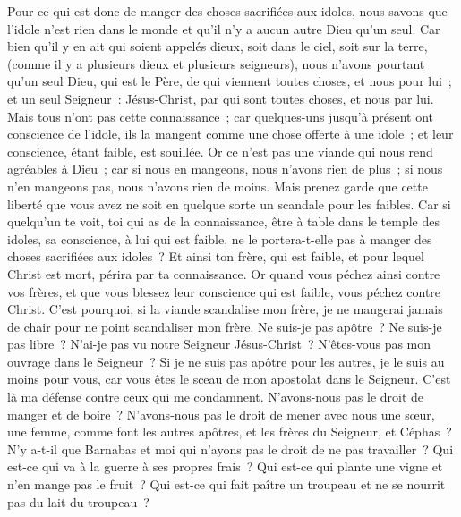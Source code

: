 \begin{multicols}{2}
Pour ce qui est donc de manger des choses sacrifiées aux idoles, nous savons que l'idole n'est rien dans le monde et qu'il n'y a aucun autre Dieu qu'un seul.
Car bien qu'il y en ait qui soient appelés dieux, soit dans le ciel, soit sur la terre, (comme il y a plusieurs dieux et plusieurs seigneurs),
nous n'avons pourtant qu'un seul Dieu, qui est le Père, de qui viennent toutes choses, et nous pour lui~; et un seul Seigneur~: Jésus-Christ, par qui sont toutes choses, et nous par lui.
Mais tous n'ont pas cette connaissance~; car quelques-uns jusqu'à présent ont conscience de l'idole, ils la mangent comme une chose offerte à une idole~; et leur conscience, étant faible, est souillée.
Or ce n'est pas une viande qui nous rend agréables à Dieu~; car si nous en mangeons, nous n'avons rien de plus~; si nous n'en mangeons pas, nous n'avons rien de moins.
Mais prenez garde que cette liberté que vous avez ne soit en quelque sorte un scandale pour les faibles.
Car si quelqu'un te voit, toi qui as de la connaissance, être à table dans le temple des idoles, sa conscience, à lui qui est faible, ne le portera-t-elle pas à manger des choses sacrifiées aux idoles~?
Et ainsi ton frère, qui est faible, et pour lequel Christ est mort, périra par ta connaissance.
Or quand vous péchez ainsi contre vos frères, et que vous blessez leur conscience qui est faible, vous péchez contre Christ.
C'est pourquoi, si la viande scandalise mon frère, je ne mangerai jamais de chair pour ne point scandaliser mon frère.
\VerseOne{}Ne suis-je pas apôtre~? Ne suis-je pas libre~? N'ai-je pas vu notre Seigneur Jésus-Christ~? N'êtes-vous pas mon ouvrage dans le Seigneur~?
Si je ne suis pas apôtre pour les autres, je le suis au moins pour vous, car vous êtes le sceau de mon apostolat dans le Seigneur.
C'est là ma défense contre ceux qui me condamnent.
N'avons-nous pas le droit de manger et de boire~?
N'avons-nous pas le droit de mener avec nous une sœur, une femme, comme font les autres apôtres, et les frères du Seigneur, et Céphas~?
N'y a-t-il que Barnabas et moi qui n'ayons pas le droit de ne pas travailler~?
Qui est-ce qui va à la guerre à ses propres frais~? Qui est-ce qui plante une vigne et n'en mange pas le fruit~? Qui est-ce qui fait paître un troupeau et ne se nourrit pas du lait du troupeau~?

\end{multicols}
